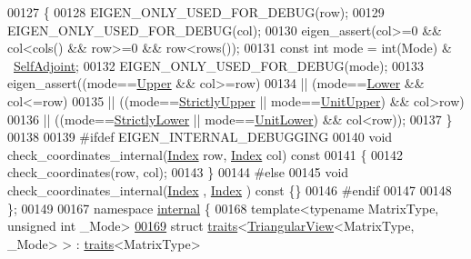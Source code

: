 \begin{DoxyCode}
00127 \textcolor{keyword}{    }\{
00128       EIGEN\_ONLY\_USED\_FOR\_DEBUG(row);
00129       EIGEN\_ONLY\_USED\_FOR\_DEBUG(col);
00130       eigen\_assert(col>=0 && col<cols() && row>=0 && row<rows());
00131       \textcolor{keyword}{const} \textcolor{keywordtype}{int} mode = int(Mode) & ~\hyperlink{group__enums_gga39e3366ff5554d731e7dc8bb642f83cda2491fc6765056421f504eb7e16083e8f}{SelfAdjoint};
00132       EIGEN\_ONLY\_USED\_FOR\_DEBUG(mode);
00133       eigen\_assert((mode==\hyperlink{group__enums_gga39e3366ff5554d731e7dc8bb642f83cda6bcb58be3b8b8ec84859ce0c5ac0aaec}{Upper} && col>=row)
00134                 || (mode==\hyperlink{group__enums_gga39e3366ff5554d731e7dc8bb642f83cda891792b8ed394f7607ab16dd716f60e6}{Lower} && col<=row)
00135                 || ((mode==\hyperlink{group__enums_gga39e3366ff5554d731e7dc8bb642f83cdae38aad7d66fecfb213fce453edff4c7a}{StrictlyUpper} || mode==\hyperlink{group__enums_gga39e3366ff5554d731e7dc8bb642f83cda8b0b63ff46dcd7377b59df14e0562fc1}{UnitUpper}) && col>row)
00136                 || ((mode==\hyperlink{group__enums_gga39e3366ff5554d731e7dc8bb642f83cda00aa79c8865ada1584c4d57bcd93299f}{StrictlyLower} || mode==\hyperlink{group__enums_gga39e3366ff5554d731e7dc8bb642f83cda8155cfdfde9e75e7144dff0393d17181}{UnitLower}) && col<row));
00137     \}
00138 
00139 \textcolor{preprocessor}{    #ifdef EIGEN\_INTERNAL\_DEBUGGING}
00140     \textcolor{keywordtype}{void} check\_coordinates\_internal(\hyperlink{group___core___module_a554f30542cc2316add4b1ea0a492ff02}{Index} row, \hyperlink{group___core___module_a554f30542cc2316add4b1ea0a492ff02}{Index} col)\textcolor{keyword}{ const}
00141 \textcolor{keyword}{    }\{
00142       check\_coordinates(row, col);
00143     \}
00144 \textcolor{preprocessor}{    #else}
00145     \textcolor{keywordtype}{void} check\_coordinates\_internal(\hyperlink{group___core___module_a554f30542cc2316add4b1ea0a492ff02}{Index} , \hyperlink{group___core___module_a554f30542cc2316add4b1ea0a492ff02}{Index} )\textcolor{keyword}{ const }\{\}
00146 \textcolor{preprocessor}{    #endif}
00147 
00148 \};
00149 
00167 \textcolor{keyword}{namespace }\hyperlink{namespaceinternal}{internal} \{
00168 \textcolor{keyword}{template}<\textcolor{keyword}{typename} MatrixType, \textcolor{keywordtype}{unsigned} \textcolor{keywordtype}{int} \_Mode>
\hyperlink{struct_eigen_1_1internal_1_1traits_3_01_triangular_view_3_01_matrix_type_00_01___mode_01_4_01_4}{00169} \textcolor{keyword}{struct }\hyperlink{struct_eigen_1_1internal_1_1traits}{traits}<\hyperlink{group___core___module_class_eigen_1_1_triangular_view}{TriangularView}<MatrixType, \_Mode> > : \hyperlink{struct_eigen_1_1internal_1_1traits}{traits}<MatrixType>

\end{DoxyCode}
